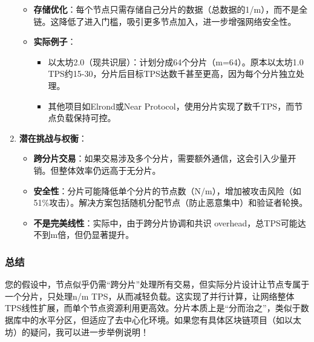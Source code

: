 \documentclass[a4paper,12pt]{ctexart}
\begin{document}
\begin{enumerate}
\begin{itemize}
        \item \textbf{存储优化}：每个节点只需存储自己分片的数据（总数据的1/m），而不是全链。这降低了进入门槛，吸引更多节点加入，进一步增强网络安全性。
        \item \textbf{实际例子}：
        \begin{itemize}
            \item 以太坊2.0（现共识层）：计划分成64个分片（m=64）。原本以太坊1.0 TPS约15-30，分片后目标TPS达数千甚至更高，因为每个分片独立处理。
            \item 其他项目如Elrond或Near Protocol，使用分片实现了数千TPS，而节点负载保持可控。
        \end{itemize}
    \end{itemize}
    \item \textbf{潜在挑战与权衡}：
    \begin{itemize}
        \item \textbf{跨分片交易}：如果交易涉及多个分片，需要额外通信，这会引入少量开销。但整体效率仍远高于无分片。
        \item \textbf{安全性}：分片可能降低单个分片的节点数（N/m），增加被攻击风险（如51\%攻击）。解决方案包括随机分配节点（防止恶意集中）和验证者轮换。
        \item \textbf{不是完美线性}：实际中，由于跨分片协调和共识 overhead，总TPS可能达不到m倍，但仍显著提升。
    \end{itemize}
\end{enumerate}

\subsubsection*{总结}
您的假设中，节点似乎仍需“跨分片”处理所有交易，但实际分片设计让节点专属于一个分片，只处理n/m TPS，从而减轻负载。这实现了并行计算，让网络整体TPS线性扩展，而单个节点资源利用更高效。分片本质上是“分而治之”，类似于数据库中的水平分区，但适应了去中心化环境。如果您有具体区块链项目（如以太坊）的疑问，我可以进一步举例说明！
\end{document}
